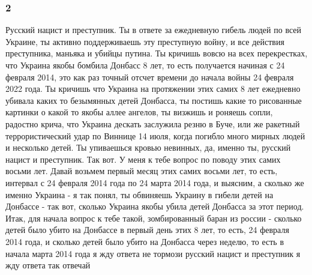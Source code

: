  
 
 
 
 

\subsubsection{2}

Русский нацист и преступник. Ты в ответе за ежедневную гибель людей по всей
Украине, ты активно поддерживаешь эту преступную войну, и все действия
преступника, маньяка и убийцы путина.  Ты кричишь вовсю на всех перекрестках,
что Украина якобы бомбила Донбасс 8 лет, то есть получается начиная с 24
февраля 2014, это как раз точный отсчет времени до начала войны 24 февраля 2022
года. Ты кричишь что Украина на протяжении этих самих 8 лет ежедневно убивала
каких то безымянных детей Донбасса, ты постишь какие то рисованные картинки о
какой то якобы аллее ангелов, ты визжишь и роняешь сопли, радостно крича, что
Украина дескать заслужила резню в Буче, или же ракетный террористический удар
по Виннице 14 июля, когда погибло много мирных людей и несколько детей. Ты
упиваешься кровью невинных, да, именно ты, русский нацист и преступник. Так
вот. У меня к тебе вопрос по поводу этих самих восьми лет.  Давай возьмем
первый месяц этих самих восьми лет, то есть, интервал с 24 февраля 2014 года по
24 марта 2014 года, и выясним, а сколько же именно Украина - я так понял, ты
обвиняешь Украину в гибели детей на Донбассе - так вот, сколько Украина якобы
убила детей Донбасса за этот период. Итак, для начала вопрос к тебе такой,
зомбированный баран из россии - сколько детей было убито на Донбассе в первый
день этих 8 лет, то есть, 24 февраля 2014 года, и сколько детей было убито на
Донбасса через неделю, то есть в начала марта 2014 года я жду ответа не тормози
русский нацист и преступник я жду ответа так отвечай
